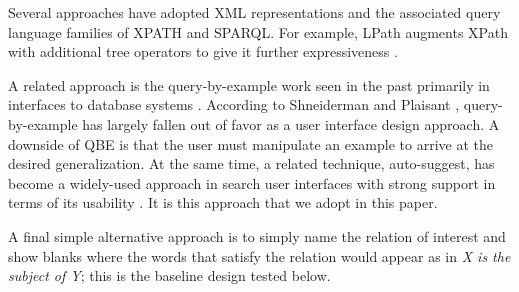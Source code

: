 Several approaches have adopted XML representations and the associated query language families of XPATH and SPARQL.   For example, LPath augments XPath with additional tree operators to give it further expressiveness \cite{lai2010querying}.


A related approach is the query-by-example work seen in the past primarily in interfaces to database systems \cite{androutsopoulos1995natural}.
According to Shneiderman and Plaisant \cite{shneiderman2010designing}, query-by-example has largely fallen out of favor as a user interface design approach.  A downside of QBE is that the user must manipulate an example to arrive at the desired generalization.  At the same time, a related technique, auto-suggest, has become a widely-used approach in search user interfaces with strong support in terms of its usability \cite{hearst2009search}.   It is this approach that we adopt in this paper.

A final simple alternative approach is to simply name the relation of interest and show blanks where the words that satisfy the relation would appear as in \emph{X is the subject of Y}; this is the baseline design tested below.
